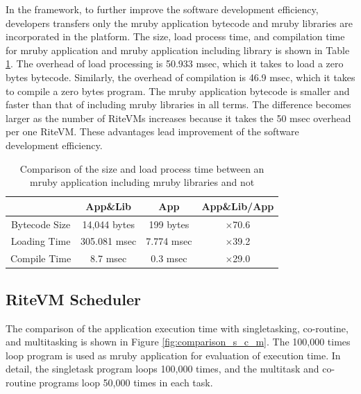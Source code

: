 \documentclass{sig-alternate-05-2015}
\begin{document}
In the framework, to further improve the software development efficiency, developers transfers only the mruby application bytecode and mruby libraries are incorporated in the platform.
The size, load process time, and compilation time for mruby application and mruby application including library is shown in Table \ref{tab:size_and_time}.
The overhead of load processing is 50.933 msec, which it takes to load a zero bytes bytecode.
Similarly, the overhead of compilation is 46.9 msec, which it takes to compile a zero bytes program.
The mruby application bytecode is smaller and faster than that of including mruby libraries in all terms.
The difference becomes larger as the number of RiteVMs increases because it takes the 50 msec overhead per one RiteVM. 
These advantages lead improvement of the software development efficiency.

\begin{table}[t]
    \centering
    \vspace{1mm}
\caption{Comparison of the size and load process time between an mruby application including mruby libraries and not}
    \vspace{1mm}
    {\tabcolsep=0.1cm
    \begin{tabular}{c||c|c|c}
                            & App\&Lib     & App        &   App\&Lib/App  \\ \hline
          Bytecode Size     & 14,044 bytes & 199 bytes  &   $\times$70.6          \\ %
          Loading Time      & 305.081 msec & 7.774 msec &   $\times$39.2          \\
          Compile Time  & 8.7 msec     & 0.3 msec   &   $\times$29.0          \\
    \end{tabular}
    }
    \label{tab:size_and_time}
\end{table}

\subsection{RiteVM Scheduler}
The comparison of the application execution time with singletasking, co-routine, and multitasking is shown in Figure \ref{fig:comparison_s_c_m}.
The 100,000 times loop program is used as mruby application for evaluation of execution time.
In detail, the singletask program loops 100,000 times, and the multitask and co-routine programs loop 50,000 times in each task.
\end{document}
